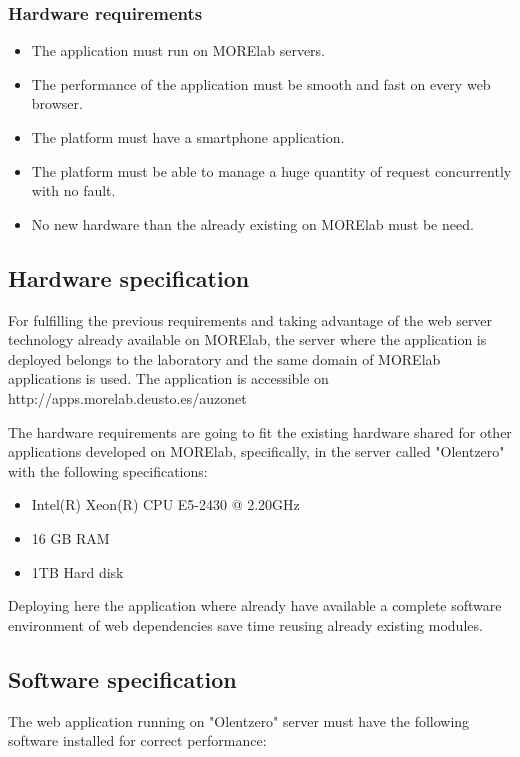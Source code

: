 \documentclass{DeustoFDP}
\begin{document}
\subsubsection{Hardware requirements}
\begin{itemize}
	\item The application must run on MORElab servers.
	\item The performance of the application must be smooth and fast on every web browser.
	\item The platform must have a smartphone application.
	\item The platform must be able to manage a huge quantity of request concurrently with no fault.
	\item No new hardware than the already existing on MORElab must be need.
\end{itemize}
\subsection{Hardware specification}
For fulfilling the previous requirements and taking advantage of the web server technology already available on MORElab, the server where the application is deployed belongs to the laboratory and the same domain of MORElab applications is used. The application is accessible on http://apps.morelab.deusto.es/auzonet

The hardware requirements are going to fit the existing hardware shared for other applications developed on MORElab, specifically, in the server called "Olentzero" with the following specifications:

\begin{itemize}
	\item Intel(R) Xeon(R) CPU E5-2430 @ 2.20GHz
	\item 16 GB RAM
	\item 1TB Hard disk
\end{itemize}

Deploying here the application where already have available a complete software environment of web dependencies save time reusing already existing modules.

\subsection{Software specification}
The web application running on "Olentzero" server must have the following software installed for correct performance:
\end{document}
